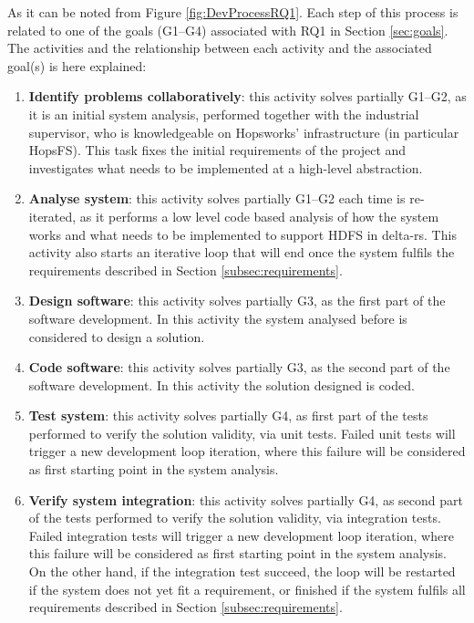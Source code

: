 As it can be noted from Figure \ref{fig:DevProcessRQ1}. Each step of this process is related to one of the goals (G1--G4) associated with RQ1 in Section \ref{sec:goals}.
The activities and the relationship between each activity and the associated goal(s) is here explained:
\begin{enumerate}
    \item \textbf{Identify problems collaboratively}: this activity solves partially G1--G2, as it is an initial system analysis, performed together with the industrial supervisor, who is knowledgeable on Hopsworks' infrastructure (in particular \gls{HopsFS}). This task fixes the initial requirements of the project and investigates what needs to be implemented at a high-level abstraction.
    \item \textbf{Analyse system}: this activity solves partially G1--G2 each time is re-iterated, as it performs a low level code based analysis of how the system works and what needs to be implemented to support \gls{HDFS} in delta-rs. This activity also starts an iterative loop that will end once the system fulfils the requirements described in Section \ref{subsec:requirements}.
    \item \textbf{Design software}: this activity solves partially G3, as the first part of the software development. In this activity the system analysed before is considered to design a solution.
    \item \textbf{Code software}: this activity solves partially G3, as the second part of the software development. In this activity the solution designed is coded.
    \item \textbf{Test system}: this activity solves partially G4, as first part of the tests performed to verify the solution validity, via unit tests. Failed unit tests will trigger a new development loop iteration, where this failure will be considered as first starting point in the system analysis.
    \item \textbf{Verify system integration}: this activity solves partially G4, as second part of the tests performed to verify the solution validity, via integration tests. Failed integration tests will trigger a new development loop iteration, where this failure will be considered as first starting point in the system analysis. On the other hand, if the integration test succeed, the loop will be restarted if the system does not yet fit a requirement, or finished if the system fulfils all requirements described in Section \ref{subsec:requirements}.
\end{enumerate}

